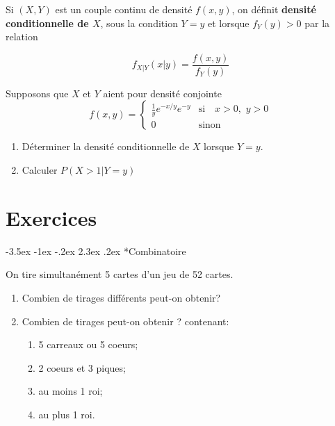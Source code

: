 \documentclass[]{book}
\makeatletter
\renewcommand\section{\@startsection {section}{1}{\z@}%
                                   {-3.5ex \@plus -1ex \@minus -.2ex}%
                                   {2.3ex \@plus.2ex}%
                                   {\normalfont\Large\bfseries\color{ForestGreen}}}
\theoremstyle{magentacolor}
\theoremstyle{proprie}
\theoremstyle{exstyle}
\theoremstyle{exostyle}
\theoremstyle{definition}
\theoremstyle{definition}
\theoremstyle{definition}
\theoremstyle{remark}
\let\BeginKnitrBlock\begin \let\EndKnitrBlock\end
\makeatother
\begin{document}
Si \((X,Y)\) est un couple continu de densité \(f(x,y)\), on définit
\textbf{densité conditionnelle de \(X\)}, sous la condition \(Y=y\) et lorsque
\(f_Y(y) > 0\) par la relation

\[f_{X|Y} (x|y) = \frac{f(x,y)}{f_Y(y)}\]

\BeginKnitrBlock{rmdexercise}
Supposons que \(X\) et \(Y\) aient pour densité conjointe
\[f(x,y)= \left\lbrace
      \begin{array}{ll}
      \frac{1}{y} e^{- x/y}e^{-y}   & \mbox{si} \quad x > 0, \,\, y > 0\\
      0 & \mbox{sinon}
      \end{array}
  \right.\]

\begin{enumerate}
\def\labelenumi{\arabic{enumi}.}
\item
  Déterminer la densité conditionnelle de \(X\) lorsque \(Y=y\).
\item
  Calculer \(P(X>1 | Y = y)\)
\end{enumerate}
\EndKnitrBlock{rmdexercise}

\hypertarget{exercices}{%
\chapter*{Exercices}\label{exercices}}

\hypertarget{combinatoire}{%
\section*{Combinatoire}\label{combinatoire}}

\BeginKnitrBlock{exercise}
\protect\hypertarget{exr:unnamed-chunk-63}{}{\label{exr:unnamed-chunk-63} }On tire simultanément 5 cartes d'un jeu de 52 cartes.

\begin{enumerate}
\def\labelenumi{\arabic{enumi}.}
\item
  Combien de tirages différents peut-on obtenir?
\item
  Combien de tirages peut-on obtenir ? contenant:

  \begin{enumerate}
  \def\labelenumii{\arabic{enumii}.}
  \item
    5 carreaux ou 5 coeurs;
  \item
    2 coeurs et 3 piques;
  \item
    au moins 1 roi;
  \item
    au plus 1 roi.
  \end{enumerate}
\end{enumerate}
\EndKnitrBlock{exercise}
\end{document}
